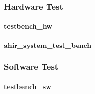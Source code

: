 \subsubsection{Hardware Test}

\paragraph{testbench\_hw \\}
\blindtext
\paragraph{ ahir\_system\_test\_bench \\}

\subsubsection{Software Test}

\paragraph{testbench\_sw \\}


